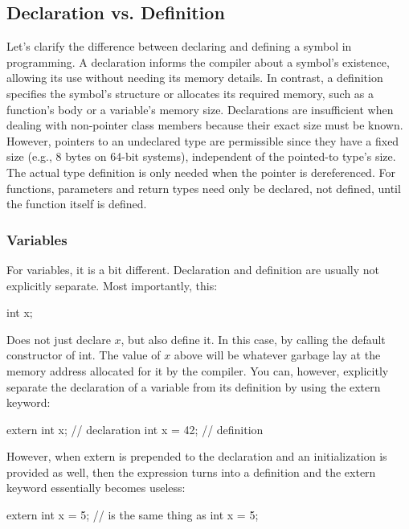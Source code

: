 \documentclass{report}
\begin{document}
\begin{concept}
    \subsection{Declaration vs. Definition}
    \bigbreak \noindent 
    Let's clarify the difference between declaring and defining a symbol in programming. A declaration informs the compiler about a symbol's existence, allowing its use without needing its memory details. In contrast, a definition specifies the symbol's structure or allocates its required memory, such as a function's body or a variable's memory size.
    \bigbreak \noindent 
    Declarations are insufficient when dealing with non-pointer class members because their exact size must be known. However, pointers to an undeclared type are permissible since they have a fixed size (e.g., 8 bytes on 64-bit systems), independent of the pointed-to type's size. The actual type definition is only needed when the pointer is dereferenced. For functions, parameters and return types need only be declared, not defined, until the function itself is defined.
    \bigbreak \noindent 
    \subsubsection{Variables}
    \bigbreak \noindent 
    For variables, it is a bit different. Declaration and definition are usually not explicitly separate. Most importantly, this:
    \bigbreak \noindent 
    \begin{cppcode}
    int x; 
    \end{cppcode}
    \bigbreak \noindent 
    Does not just declare $x$, but also define it. In this case, by calling the default constructor of int. The value of $x$ above will be whatever garbage lay at the memory address allocated for it by the compiler. 
    \bigbreak \noindent 
    You can, however, explicitly separate the declaration of a variable from its definition by using the extern keyword:
    \bigbreak \noindent 
    \begin{cppcode}
    extern int x; // declaration
    int x = 42;   // definition
    \end{cppcode}
    \bigbreak \noindent 
    However, when extern is prepended to the declaration and an initialization is provided as well, then the expression turns into a definition and the extern keyword essentially becomes useless:
    \bigbreak \noindent 
    \begin{cppcode}
    extern int x = 5; // is the same thing as
    int x = 5;
    \end{cppcode}


\end{concept}
\end{document}

